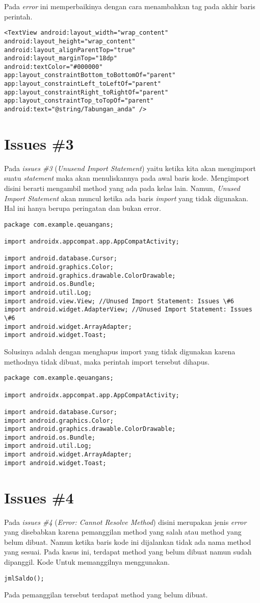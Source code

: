 Pada \textit{error} ini memperbaikinya dengan cara menambahkan tag pada akhir baris perintah.
\begin{verbatim}
<TextView android:layout_width="wrap_content"
android:layout_height="wrap_content"
android:layout_alignParentTop="true"
android:layout_marginTop="18dp"
android:textColor="#000000"
app:layout_constraintBottom_toBottomOf="parent"
app:layout_constraintLeft_toLeftOf="parent"
app:layout_constraintRight_toRightOf="parent"
app:layout_constraintTop_toTopOf="parent"
android:text="@string/Tabungan_anda" />
\end{verbatim}

\section{Issues \#3}
Pada \textit{issues \#3} (\textit{Unusend Import Statement}) yaitu ketika kita akan mengimport suatu \textit{statement} maka akan menuliskannya pada awal baris kode. Mengimport disini berarti mengambil method yang ada pada kelas lain. Namun, \textit{Unused Import Statement} akan muncul ketika ada baris \textit{import} yang tidak digunakan. Hal ini hanya berupa peringatan dan bukan error.
\begin{verbatim}
package com.example.qeuangans;

import androidx.appcompat.app.AppCompatActivity;

import android.database.Cursor;
import android.graphics.Color;
import android.graphics.drawable.ColorDrawable;
import android.os.Bundle;
import android.util.Log;
import android.view.View; //Unused Import Statement: Issues \#6
import android.widget.AdapterView; //Unused Import Statement: Issues \#6
import android.widget.ArrayAdapter;
import android.widget.Toast;
\end{verbatim}

Solusinya adalah dengan menghapus import yang tidak digunakan karena methodnya tidak dibuat, maka perintah import tersebut dihapus. 
\begin{verbatim}
package com.example.qeuangans;

import androidx.appcompat.app.AppCompatActivity;

import android.database.Cursor;
import android.graphics.Color;
import android.graphics.drawable.ColorDrawable;
import android.os.Bundle;
import android.util.Log;
import android.widget.ArrayAdapter;
import android.widget.Toast;
\end{verbatim}

\section{Issues \#4}
Pada \textit{issues \#4} (\textit{Error: Cannot Resolve Method}) disini merupakan jenis \textit{error} yang disebabkan karena pemanggilan method yang salah atau method yang belum dibuat. Namun ketika baris kode ini dijalankan tidak ada nama method yang sesuai. Pada kasus ini, terdapat method yang belum dibuat namun sudah dipanggil. Kode Untuk memanggilnya menggunakan.
\begin{verbatim}
jmlSaldo();
\end{verbatim}
Pada pemanggilan tersebut terdapat method yang belum dibuat.

